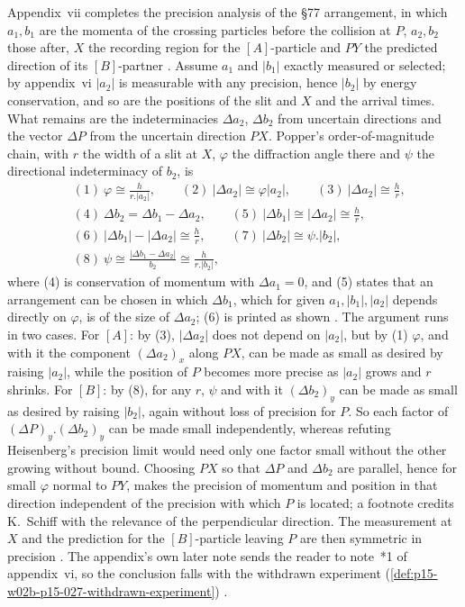 Appendix~vii completes the precision analysis of the \S77 arrangement, in
which \(a_1,b_1\) are the momenta of the crossing particles before the
collision at \(P\), \(a_2,b_2\) those after, \(X\) the recording region
for the \([A]\)-particle and \(PY\) the predicted direction of its
\([B]\)-partner \parencite[\S77, pp.~239--241]{Popper2002LogicDiscoveryUI}.
Assume \(a_1\) and \(|b_1|\) exactly measured or selected; by appendix~vi
\(|a_2|\) is measurable with any precision, hence \(|b_2|\) by energy
conservation, and so are the positions of the slit and \(X\) and the
arrival times. What remains are the indeterminacies \(\Delta a_2\),
\(\Delta b_2\) from uncertain directions and the vector \(\Delta P\) from
the uncertain direction \(PX\). Popper's order-of-magnitude chain, with
\(r\) the width of a slit at \(X\), \(\varphi\) the diffraction angle there
and \(\psi\) the directional indeterminacy of \(b_2\), is
\[
\begin{aligned}
 &(1)\ \varphi\cong\frac{h}{r.|a_2|},\qquad
 (2)\ |\Delta a_2|\cong\varphi|a_2|,\qquad
 (3)\ |\Delta a_2|\cong\frac{h}{r},\\
 &(4)\ \Delta b_2=\Delta b_1-\Delta a_2,\qquad
 (5)\ |\Delta b_1|\cong|\Delta a_2|\cong\frac{h}{r},\\
 &(6)\ |\Delta b_1|-|\Delta a_2|\cong\frac{h}{r},\qquad
 (7)\ |\Delta b_2|\cong\psi.|b_2|,\\
 &(8)\ \psi\cong\frac{|\Delta b_1-\Delta a_2|}{b_2}\cong\frac{h}{r.|b_2|},
\end{aligned}
\]
where (4) is conservation of momentum with \(\Delta a_1=0\), and (5)
states that an arrangement can be chosen in which \(\Delta b_1\), which
for given \(a_1,|b_1|,|a_2|\) depends directly on \(\varphi\), is of the
size of \(\Delta a_2\); (6) is printed as shown
\parencite[appendix~vii, pp.~305--307]{Popper2002LogicDiscoveryUI}.
The argument runs in two cases. For \([A]\): by (3), \(|\Delta a_2|\) does
not depend on \(|a_2|\), but by (1) \(\varphi\), and with it the
component \((\Delta a_2)_x\) along \(PX\), can be made as small as desired
by raising \(|a_2|\), while the position of \(P\) becomes more precise as
\(|a_2|\) grows and \(r\) shrinks. For \([B]\): by (8), for any \(r\),
\(\psi\) and with it \((\Delta b_2)_y\) can be made as small as desired by
raising \(|b_2|\), again without loss of precision for \(P\). So each
factor of \((\Delta P)_y.(\Delta b_2)_y\) can be made small independently,
whereas refuting Heisenberg's precision limit would need only one factor
small without the other growing without bound. Choosing \(PX\) so that
\(\Delta P\) and \(\Delta b_2\) are parallel, hence for small \(\varphi\)
normal to \(PY\), makes the precision of momentum and position in that
direction independent of the precision with which \(P\) is located; a
footnote credits K.~Schiff with the relevance of the perpendicular
direction. The measurement at \(X\) and the prediction for the
\([B]\)-particle leaving \(P\) are then symmetric in precision
\parencite[appendix~vii and note~1, pp.~307--308]{Popper2002LogicDiscoveryUI}.
The appendix's own later note sends the reader to note~*1 of
appendix~vi, so the conclusion falls with the withdrawn experiment
(\cref{def:p15-w02b-p15-027-withdrawn-experiment})
\parencite[appendix~vii, note~*1, p.~305]{Popper2002LogicDiscoveryUI}.

